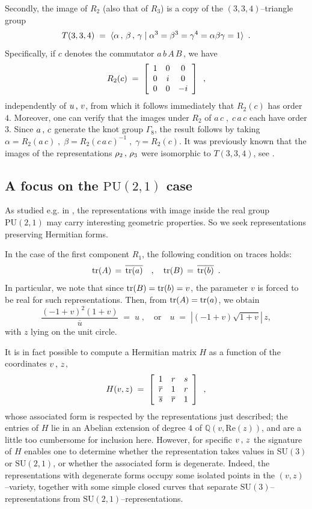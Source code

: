 Secondly, the image of $R_2$ (also that of $R_3$) is a copy of the $(3,3,4)$--triangle group
\[ T(3,3,4) \;=\; \langle \alpha \,,\, \beta \,,\, \gamma \;|\;
   \alpha^3 = \beta^3 = \gamma^4 = \alpha\beta\gamma = 1 \rangle \hspace{.5em}.\]
Specifically, if $c$ denotes the commutator $a\,b\,A\,B$\,, we have
\[ R_2(c) \;=\; \left[\begin{array}{ccc}1&0&0\\0&i&0\\0&0&-i\end{array}\right] \hspace{.5em},\]
independently of $u \,,\, v$, from which it follows immediately that $R_2(c)$ has order $4$.
Moreover, one can verify that the images under $R_2$ of $a\,c \;,\; c\,a\,c$ each have
order $3$.  Since $a \,,\, c$ generate the knot group $\Gamma_8$, the result follows by taking
$\alpha = R_2(a\,c) \;,\; \beta = R_2(c\,a\,c)^{-1} \;,\; \gamma = R_2(c)$.  It was
previously known that the images of the representations $\rho_2 \,,\, \rho_3$
were isomorphic to $T(3,3,4)$, see \cite{DF}.

\subsection{A focus on the $\mathrm{PU}(2,1)$ case}

As studied e.g. in \cite{DF}, the representations with image inside the real group $\mathrm{PU}(2,1)$ may carry interesting geometric properties. So we seek representations preserving Hermitian forms.

In the case of the first component $R_1$, the following condition on traces holds:
\[ \mathrm{tr}(A) \,=\, \overline{\mathrm{tr}(a)} \quad,\quad \mathrm{tr}(B) \,=\, \overline{\mathrm{tr}(b)} \hspace{.5em}.\]
In particular, we note that since $\mathrm{tr}(B) = \mathrm{tr}(b) = v$, the parameter $v$ is forced to be real
for such representations.  Then, from $\mathrm{tr}(A) = \mathrm{tr}(a)$, we obtain
\[ 
\frac{(-1+v)^2(1+v)}{\overline{u}} \;=\; u\;,
\quad\text{or}\quad
u \;=\; |  \left(-1+v\right)\sqrt{1+v} |  \, z ,
\]
with $z$ lying on the unit circle.
\vv

It is in fact possible to compute a Hermitian matrix $H$ as a function of the coordinates
$v \,,\, z$,
\[ H(v,z) \;=\; \left[\begin{array}{ccc}1&r&s\\\overline{r}&1&r\\\overline{s}&\overline{r}&1\end{array}\right]\hspace{.5em},\]
whose associated form is respected by the representations just described;
the entries of $H$ lie in an Abelian extension of degree $4$ of $\mathbb Q(v,\mathrm{Re}(z))$,
and are a little too cumbersome for inclusion here.  However, for specific $v \,,\, z$
the signature of $H$ enables one to determine whether the representation
takes values in $\mathrm{SU(3)}$ or $\mathrm{SU(2,1)}$, or whether the associated
form is degenerate.  Indeed, the representations with degenerate forms occupy some
isolated points in the $(v,z)$--variety, together with some simple closed curves that
separate $\mathrm{SU(3)}$--representations from $\mathrm{SU(2,1)}$--representations.
\vv

